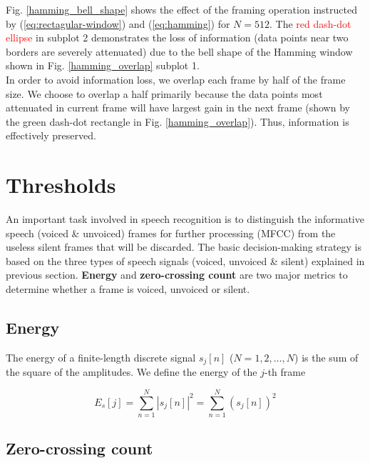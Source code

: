 Fig. \ref{hamming_bell_shape} shows the effect of the framing operation instructed by (\ref{eq:rectagular-window}) and (\ref{eq:hamming}) for $N = 512$. The \textcolor{red}{red dash-dot ellipse} in subplot 2 demonstrates the loss of information (data points near two borders are severely attenuated) due to the bell shape of the Hamming window shown in Fig. \ref{hamming_overlap} subplot 1.\\

In order to avoid information loss, we overlap each frame by half of the frame size. We choose to overlap a half primarily because the data points most attenuated in current frame will have largest gain in the next frame (shown by the \textcolor{green_html}{green dash-dot rectangle} in Fig. \ref{hamming_overlap}). Thus, information is effectively preserved.


\section{Thresholds}

An important task involved in speech recognition is to distinguish the informative speech (voiced \& unvoiced) frames for further processing (MFCC) from the useless silent frames that will be discarded. The basic decision-making strategy is based on the three types of speech signals (voiced, unvoiced \& silent) explained in previous section. \textbf{Energy} and \textbf{zero-crossing count} are two major metrics to determine whether a frame is voiced, unvoiced or silent.


\subsection{Energy}

The energy of a finite-length discrete signal $s_j[n]$ ($N = 1, 2, \dots, N$) is the sum of the square of the amplitudes. We define the energy of the $j$-th frame

\begin{equation}
\label{eq:frame-energy}
E_s[j] = \sum_{n=1}^{N} |s_j[n]|^2 = \sum_{n=1}^{N} (s_j[n])^2
\end{equation}


\subsection{Zero-crossing count}

